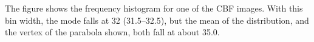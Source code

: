 \label{fig:smoothed_mode} The figure shows the frequency histogram for one of the CBF images. With this bin width, the mode falls at 32 (31.5--32.5), but the mean of the distribution, and the vertex of the parabola shown, both fall at about 35.0.